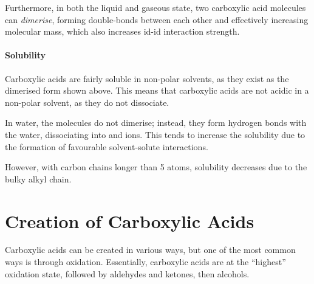 		\pagebreak
		Furthermore, in both the liquid and gaseous state, two carboxylic acid molecules can \textit{dimerise}, forming double-bonds between
		each other and effectively increasing molecular mass, which also increases id-id interaction strength.




		\paragraph{Solubility}

		Carboxylic acids are fairly soluble in non-polar solvents, as they exist as the dimerised form shown above. This means that carboxylic acids
		are not acidic in a non-polar solvent, as they do not dissociate.

		In water, the molecules do not dimerise; instead, they form hydrogen bonds with the water, dissociating into  and  ions.
		This tends to increase the solubility due to the formation of favourable solvent-solute interactions.

		However, with carbon chains longer than 5 atoms, solubility decreases due to the bulky alkyl chain.



	\pagebreak
	\section{Creation of Carboxylic Acids}

		Carboxylic acids can be created in various ways, but one of the most common ways is through oxidation. Essentially, carboxylic acids
		are at the \enquote{highest} oxidation state, followed by aldehydes and ketones, then alcohols.

